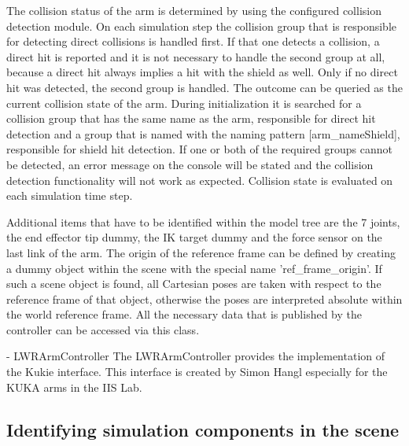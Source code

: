   The collision status of the arm is determined by using the configured collision detection module.
  On each simulation step the collision group that is responsible for detecting direct collisions is 
  handled first. If that one detects a collision, a direct hit is reported and it is not necessary
  to handle the second group at all, because a direct hit always implies a hit with the shield as
  well. Only if no direct hit was detected, the second group is handled. The outcome can be queried
  as the current collision state of the arm. During initialization it is searched for a collision
  group that has the same name as the arm, responsible for direct hit detection and a group that is
  named with the naming pattern [arm\_nameShield], responsible for shield hit detection. If one or
  both of the required groups cannot be detected, an error message on the console will be stated and
  the collision detection functionality will not work as expected. Collision state is evaluated on 
  each simulation time step.
  
  Additional items that have to be identified within the model tree are the 7 joints, the end
  effector tip dummy, the IK target dummy and the force sensor on the last link of the arm. The
  origin of the reference frame can be defined by creating a dummy object within the scene with
  the special name 'ref\_frame\_origin'. If such a scene object is found, all Cartesian poses are
  taken with respect to the reference frame of that object, otherwise the poses are interpreted
  absolute within the world reference frame. All the necessary data that is published by the 
  controller can be accessed via this class.
  
- LWRArmController
  The LWRArmController provides the implementation of the Kukie interface. This interface is created
  by Simon Hangl especially for the KUKA arms in the IIS Lab.
  
\subsection{Identifying simulation components in the scene}

